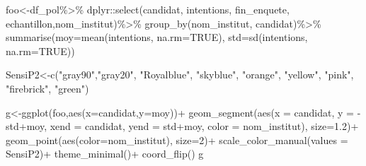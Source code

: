 \documentclass[
]{book}
\newenvironment{Shaded}{\begin{snugshade}}{\end{snugshade}}
\newcommand{\AttributeTok}[1]{\textcolor[rgb]{0.77,0.63,0.00}{#1}}
\newcommand{\ConstantTok}[1]{\textcolor[rgb]{0.00,0.00,0.00}{#1}}
\newcommand{\DecValTok}[1]{\textcolor[rgb]{0.00,0.00,0.81}{#1}}
\newcommand{\FloatTok}[1]{\textcolor[rgb]{0.00,0.00,0.81}{#1}}
\newcommand{\FunctionTok}[1]{\textcolor[rgb]{0.00,0.00,0.00}{#1}}
\newcommand{\NormalTok}[1]{#1}
\newcommand{\OtherTok}[1]{\textcolor[rgb]{0.56,0.35,0.01}{#1}}
\newcommand{\SpecialCharTok}[1]{\textcolor[rgb]{0.00,0.00,0.00}{#1}}
\newcommand{\StringTok}[1]{\textcolor[rgb]{0.31,0.60,0.02}{#1}}
\begin{document}
\begin{Shaded}
\begin{Highlighting}[]
\NormalTok{foo}\OtherTok{\textless{}{-}}\NormalTok{df\_pol}\SpecialCharTok{\%\textgreater{}\%}
\NormalTok{  dplyr}\SpecialCharTok{::}\FunctionTok{select}\NormalTok{(candidat, intentions, fin\_enquete, echantillon,nom\_institut)}\SpecialCharTok{\%\textgreater{}\%}
  \FunctionTok{group\_by}\NormalTok{(nom\_institut, candidat)}\SpecialCharTok{\%\textgreater{}\%}
  \FunctionTok{summarise}\NormalTok{(}\AttributeTok{moy=}\FunctionTok{mean}\NormalTok{(intentions, }\AttributeTok{na.rm=}\ConstantTok{TRUE}\NormalTok{),}
            \AttributeTok{std=}\FunctionTok{sd}\NormalTok{(intentions, }\AttributeTok{na.rm=}\ConstantTok{TRUE}\NormalTok{))}


\NormalTok{SensiP2}\OtherTok{\textless{}{-}}\FunctionTok{c}\NormalTok{(}\StringTok{"gray90"}\NormalTok{,}\StringTok{"gray20"}\NormalTok{, }\StringTok{"Royalblue"}\NormalTok{, }\StringTok{"skyblue"}\NormalTok{, }\StringTok{"orange"}\NormalTok{, }\StringTok{"yellow"}\NormalTok{, }\StringTok{"pink"}\NormalTok{, }\StringTok{"firebrick"}\NormalTok{, }\StringTok{"green"}\NormalTok{)}


\NormalTok{g}\OtherTok{\textless{}{-}}\FunctionTok{ggplot}\NormalTok{(foo,}\FunctionTok{aes}\NormalTok{(}\AttributeTok{x=}\NormalTok{candidat,}\AttributeTok{y=}\NormalTok{moy))}\SpecialCharTok{+}
  \FunctionTok{geom\_segment}\NormalTok{(}\FunctionTok{aes}\NormalTok{(}\AttributeTok{x =}\NormalTok{ candidat, }
                   \AttributeTok{y =} \SpecialCharTok{{-}}\NormalTok{std}\SpecialCharTok{+}\NormalTok{moy, }
                   \AttributeTok{xend =}\NormalTok{ candidat, }
                   \AttributeTok{yend =}\NormalTok{ std}\SpecialCharTok{+}\NormalTok{moy, }
                   \AttributeTok{color =}\NormalTok{ nom\_institut), }\AttributeTok{size=}\FloatTok{1.2}\NormalTok{)}\SpecialCharTok{+}
    \FunctionTok{geom\_point}\NormalTok{(}\FunctionTok{aes}\NormalTok{(}\AttributeTok{color=}\NormalTok{nom\_institut), }\AttributeTok{size=}\DecValTok{2}\NormalTok{)}\SpecialCharTok{+}
  \FunctionTok{scale\_color\_manual}\NormalTok{(}\AttributeTok{values =}\NormalTok{ SensiP2)}\SpecialCharTok{+}
  \FunctionTok{theme\_minimal}\NormalTok{()}\SpecialCharTok{+}
  \FunctionTok{coord\_flip}\NormalTok{()}
\NormalTok{g}
\end{Highlighting}
\end{Shaded}
\end{document}
